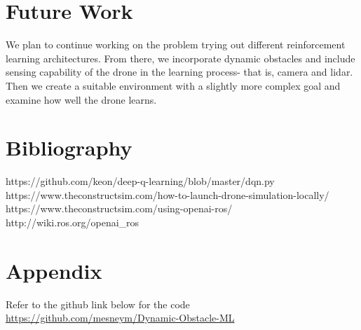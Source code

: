 \documentclass[12pt]{article}
\begin{document}
\section{Future Work}
We plan to continue working on the problem trying out different reinforcement learning architectures. From there, we incorporate 
dynamic obstacles and include sensing capability of the drone in the learning process- that is, camera and lidar. Then we create a suitable
environment with a slightly more complex goal and examine how well the drone learns.
\section{Bibliography}
https://github.com/keon/deep-q-learning/blob/master/dqn.py \\
https://www.theconstructsim.com/how-to-launch-drone-simulation-locally/ \\
https://www.theconstructsim.com/using-openai-ros/
http://wiki.ros.org/openai\_ros

\section{Appendix}
Refer to the github link below for the code \\
\href{https://github.com/mesneym/Dynamic-Obstacle-ML}{https://github.com/mesneym/Dynamic-Obstacle-ML}
\end{document}
